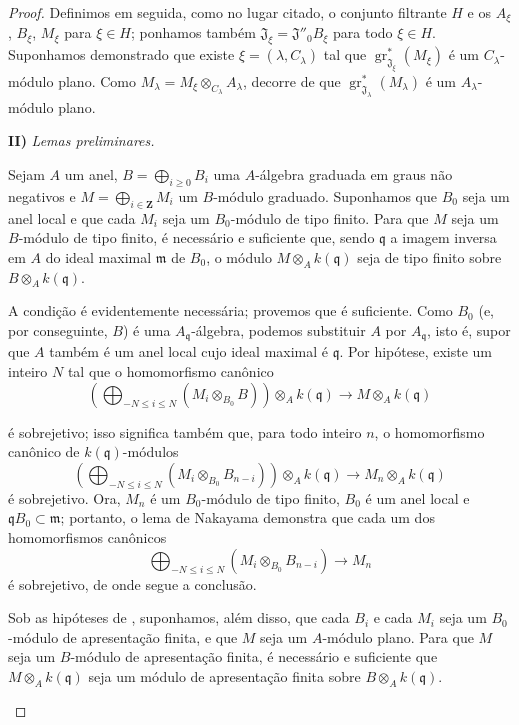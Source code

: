 \begin{proof}
Definimos em seguida, como no lugar citado, o conjunto filtrante $H$ e os $A_\xi$, $B_\xi$, $M_\xi$ para $\xi\in H$; ponhamos também $\mathfrak J_\xi=\mathfrak J''_0B_\xi$ para todo $\xi\in H$. Suponhamos demonstrado que existe $\xi=(\lambda,C_\lambda)$ tal que $\operatorname{gr}_{\mathfrak J_\xi}^*(M_\xi)$ é um $C_\lambda$-módulo plano. Como $M_\lambda=M_\xi\otimes_{C_\lambda}A_\lambda$, decorre de  que $\operatorname{gr}_{\mathfrak J_\lambda}^*(M_\lambda)$ é um $A_\lambda$-módulo plano.

\medskip
\noindent\textbf{II)} \emph{Lemas preliminares.}

\begin{lemma}[11.2.9.3]
\label{IV.11.2.9.3}
Sejam $A$ um anel, $B=\bigoplus_{i\geq0}B_i$ uma $A$-álgebra graduada em graus não negativos e $M=\bigoplus_{i\in\mathbf Z}M_i$ um $B$-módulo graduado. Suponhamos que $B_0$ seja um anel local e que cada $M_i$ seja um $B_0$-módulo de tipo finito. Para que $M$ seja um $B$-módulo de tipo finito, é necessário e suficiente que, sendo $\mathfrak q$ a imagem inversa em $A$ do ideal maximal $\mathfrak m$ de $B_0$, o módulo $M\otimes_Ak(\mathfrak q)$ seja de tipo finito sobre $B\otimes_Ak(\mathfrak q)$.
\end{lemma}

A condição é evidentemente necessária; provemos que é suficiente. Como $B_0$ (e, por conseguinte, $B$) é uma $A_{\mathfrak q}$-álgebra, podemos substituir $A$ por $A_{\mathfrak q}$, isto é, supor que $A$ também é um anel local cujo ideal maximal é $\mathfrak q$. Por hipótese, existe um inteiro $N$ tal que o homomorfismo canônico
\[
\left(\bigoplus_{-N\leq i\leq N}(M_i\otimes_{B_0}B)\right)
\otimes_Ak(\mathfrak q)\longrightarrow M\otimes_Ak(\mathfrak q)
\]


é sobrejetivo; isso significa também que, para todo inteiro $n$, o homomorfismo canônico de $k(\mathfrak q)$-módulos
\[
\left(\bigoplus_{-N\leq i\leq N}(M_i\otimes_{B_0}B_{n-i})\right)
\otimes_Ak(\mathfrak q)\longrightarrow M_n\otimes_Ak(\mathfrak q)
\]
é sobrejetivo. Ora, $M_n$ é um $B_0$-módulo de tipo finito, $B_0$ é um anel local e $\mathfrak qB_0\subset\mathfrak m$; portanto, o lema de Nakayama demonstra que cada um dos homomorfismos canônicos
\[
\bigoplus_{-N\leq i\leq N}(M_i\otimes_{B_0}B_{n-i})
\longrightarrow M_n
\]
é sobrejetivo, de onde segue a conclusão.

\begin{corollary}[11.2.9.4]
\label{IV.11.2.9.4}
Sob as hipóteses de , suponhamos, além disso, que cada $B_i$ e cada $M_i$ seja um $B_0$-módulo de apresentação finita, e que $M$ seja um $A$-módulo plano. Para que $M$ seja um $B$-módulo de apresentação finita, é necessário e suficiente que $M\otimes_Ak(\mathfrak q)$ seja um módulo de apresentação finita sobre $B\otimes_Ak(\mathfrak q)$.
\end{corollary}


\end{proof}
